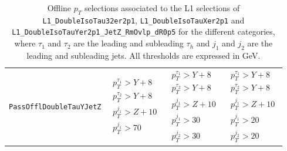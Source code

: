 \documentclass[../main.tex]{subfiles}
\begin{document}
\begin{table}
\begin{center}
\begin{tabular}{c || c | c | c }
		\texttt{PassOfflDoubleTauYJetZ} &
			$\begin{matrix}
				p_T^{\tau_1}>Y+8\\
				p_T^{\tau_2}>Y+8\\
				p_T^{j_1}>Z+10 \\
				p_T^{j_1}>70
			\end{matrix}$ &
			$\begin{matrix}
				p_T^{\tau_1}>Y+8\\
				p_T^{\tau_2}>Y+8\\
				p_T^{j_1}>Z+10 \\
				p_T^{j_1}>30 \\
				p_T^{j_2}>30
			\end{matrix}$ &
			$\begin{matrix}
				p_T^{\tau_1}>Y+8\\
				p_T^{\tau_2}>Y+8\\
				p_T^{j_1}>Z+10 \\
				p_T^{j_1}>20 \\
				p_T^{j_2}>20
			\end{matrix}$
	\end{tabular}
	\end{center}

	\caption[Offline $p_T$ selections associated to the L1 selections]{Offline $p_T$ selections associated to the L1 selections of \texttt{L1\_DoubleIsoTau32er2p1}, \texttt{L1\_DoubleIsoTauXer2p1} and \texttt{L1\_DoubleIsoTauYer2p1\_JetZ\_RmOvlp\_dR0p5} for the different categories, where $\tau_1$ and $\tau_2$ are the leading and subleading $\tau_h$ and $j_1$ and $j_2$ are the leading and subleading jets. All thresholds are expressed in GeV.}
	\label{hh:tab:trig_offpt}
\end{table}
\end{document}
